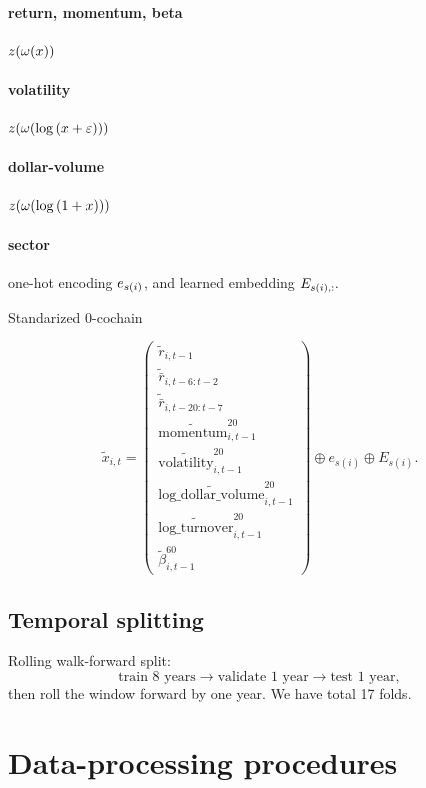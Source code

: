 \documentclass[11pt]{article}
\begin{document}
\paragraph{return, momentum, beta}  $z{\left\lparen\omega{\left\lparen x\right\rparen}\right\rparen}$

\paragraph{volatility} $z{\left\lparen\omega{\left\lparen\log{\left\lparen x+\varepsilon\right\rparen}\right\rparen}\right\rparen}$

\paragraph{dollar-volume} $z{\left\lparen\omega{\left\lparen\log{\left\lparen1+x\right\rparen}\right\rparen}\right\rparen}$

\paragraph{sector} one-hot encoding $e_{s{\left\lparen i\right\rparen}}$, and learned embedding $E_{s{\left\lparen i\right\rparen},:}.$


Standarized 0-cochain

\[\tilde x_{i,t} = \begin{pmatrix}
    \tilde r_{i,t-1}\\
    \widetilde{\bar{r}}_{i,t-6:t-2}\\
    \widetilde{\bar{r}}_{i,t-20:t-7}\\
    \widetilde{\operatorname{momentum}}^{20}_{i,t-1}\\ 
    \widetilde{\operatorname{volatility}}^{20}_{i,t-1}\\ 
    \widetilde{\operatorname{log\_dollar\_volume}}^{20}_{i,t-1}\\
    \widetilde{\operatorname{log\_turnover}}^{20}_{i,t-1}\\
    \tilde \beta^{60}_{i,t-1}
\end{pmatrix}\oplus e_{s(i)}\oplus E_{s(i)}.\]




\subsection{Temporal splitting}
Rolling walk-forward split:
\[
    \text{train 8 years} \to \text{validate 1 year} \to \text{test 1 year},
\]
then roll the window forward by one year. We have total 17 folds. 

\section{Data-processing procedures}
\end{document}
